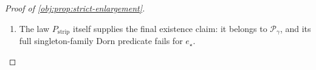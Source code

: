 \documentclass[11pt]{article}
\begin{document}
\begin{proof}[Proof of \cref{obj:prop:strict-enlargement}]
\begin{enumerate}
Finally, conditioning on \(X\) and using
\(P_{\mathrm{strip}}(A=1\mid X)=e_\star(X)\) gives the numerator and denominator identities
\[
N_{\mathrm{strip}}(h)
=
\int_{\mathcal Q_{\mathrm{ctr},h}}
\left(\frac{x_2-1/2}{h}\right)^2e_\star(x)\,dx,
\qquad
D_{\mathrm{strip}}(h)
=
\int_{\mathcal Q_{\mathrm{ctr},h}}e_\star(x)\,dx.
\]
All integrands are nonnegative. Dividing the numerator upper bound by the positive denominator lower bound therefore yields
\[
0\le T_{\mathrm{strip}}(h)\le G_{\mathrm{strip}}(h),
\qquad 0<h\le1/2.
\]
The squeeze theorem proves
\[
\lim_{h\downarrow0}T_{\mathrm{strip}}(h)=0,
\]
which is exactly the asserted normalized treated-design limit.

\item The law \(P_{\mathrm{strip}}\) itself supplies the final existence claim: it belongs to \(\mathcal P_\gamma\), and its full singleton-family Dorn predicate fails for \(e_\star\).
\end{enumerate}
\end{proof}
\end{document}

